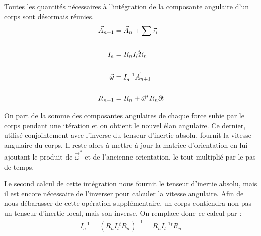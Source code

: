 Toutes les quantités nécessaires à l'intégration de la composante
angulaire d'un corps sont désormais réunies.
\begin{align*}
  \vec{A}_{n+1} &= \vec{A}_n + \sum \vec{\tau}_i \\ \\
  I_a &= R_n I_l {}^t\!\!R_n \\ \\
  \vec{\omega} &= I^{-1}_a \vec{A}_{n+1} \\ \\
  R_{n+1} &= R_n + \vec{\omega}^* R_n \partial \! t
\end{align*}

On part de la somme des composantes angulaires de chaque force subie
par le corps pendant une itération et on obtient le nouvel élan
angulaire. Ce dernier, utilisé conjointement avec l'inverse du tenseur
d'inertie absolu, fournit la vitesse angulaire du corps. Il reste
alors à mettre à jour la matrice d'orientation en lui ajoutant le
produit de $\vec{\omega}^*$ et de l'ancienne orientation, le tout
multiplié par le pas de temps.

Le second calcul de cette intégration nous fournit le tenseur
d'inertie absolu, mais il est encore nécessaire de l'inverser pour
calculer la vitesse angulaire. Afin de nous débarasser de cette
opération supplémentaire, un corps contiendra non pas un tenseur
d'inertie local, mais son inverse. On remplace donc ce calcul par :
\begin{align*}
  I^{-1}_a = (R_n I_l {}^t\!\!R_n)^{-1} = R_n I^{-1}_l {}^t\!\!R_n
\end{align*}
